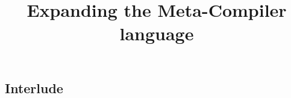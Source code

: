 


\begin{multicols}{3}
\title{Expanding the Meta-Compiler language}
\author{\writer}





\setcounter{tocdepth}{2}
\tableofcontents
\cleardoublepage
{}
\addtocounter{page}{4}



% 

\chapter{Interlude}



\end{multicols}
